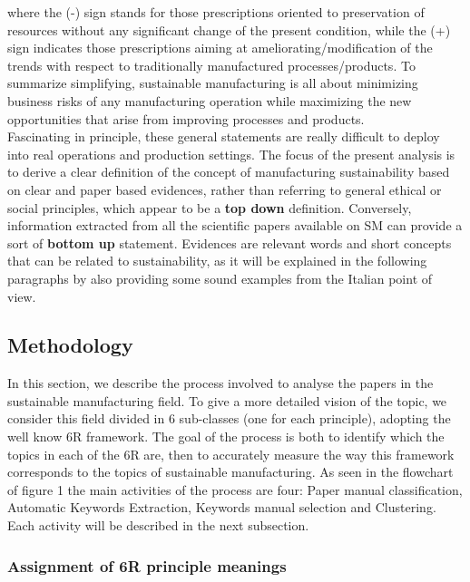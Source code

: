 \documentclass[]{book}
\theoremstyle{definition}
\theoremstyle{definition}
\theoremstyle{definition}
\theoremstyle{remark}
\begin{document}
where the (-) sign stands for those prescriptions oriented to
preservation of resources without any significant change of the present
condition, while the (+) sign indicates those prescriptions aiming at
ameliorating/modification of the trends with respect to traditionally
manufactured processes/products. To summarize simplifying, sustainable
manufacturing is all about minimizing business risks of any
manufacturing operation while maximizing the new opportunities that
arise from improving processes and products.\\
Fascinating in principle, these general statements are really difficult
to deploy into real operations and production settings. The focus of the
present analysis is to derive a clear definition of the concept of
manufacturing sustainability based on clear and paper based evidences,
rather than referring to general ethical or social principles, which
appear to be a \textbf{top down} definition. Conversely, information
extracted from all the scientific papers available on SM can provide a
sort of \textbf{bottom up} statement. Evidences are relevant words and
short concepts that can be related to sustainability, as it will be
explained in the following paragraphs by also providing some sound
examples from the Italian point of view.

\subsection{Methodology}\label{methodology-2}

In this section, we describe the process involved to analyse the papers
in the sustainable manufacturing field. To give a more detailed vision
of the topic, we consider this field divided in 6 sub-classes (one for
each principle), adopting the well know 6R framework. The goal of the
process is both to identify which the topics in each of the 6R are, then
to accurately measure the way this framework corresponds to the topics
of sustainable manufacturing. As seen in the flowchart of figure 1 the
main activities of the process are four: Paper manual classification,
Automatic Keywords Extraction, Keywords manual selection and Clustering.
Each activity will be described in the next subsection.

\subsubsection*{Assignment of 6R principle
meanings}\label{assignment-of-6r-principle-meanings}
\end{document}
